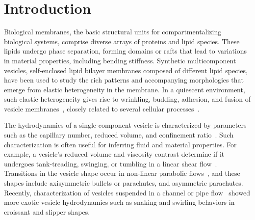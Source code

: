 \documentclass[twoside,twocolumn,9pt]{article}
\begin{document}



\section{\label{sec:Introduction}Introduction}
Biological membranes, the basic structural units for compartmentalizing
biological systems, 
comprise diverse arrays of
proteins and lipid species. 
These lipids undergo phase separation, forming domains or rafts that
lead to variations in material properties, including bending stiffness.
Synthetic multicomponent vesicles, self-enclosed lipid bilayer membranes
composed of different lipid species, have been used to study the rich
patterns and accompanying morphologies that emerge from elastic
heterogeneity in the membrane. In a quiescent environment, such elastic
heterogeneity gives rise to wrinkling, budding, adhesion, and fusion of
vesicle membranes~\cite{Lowengrub2009_PRE, Li2012_CommMathSci,
Zhao2011_PRE}, closely related to several cellular
processes~\cite{Rauch2000_BiophysJ, Takeda2003_PNAS}.

The hydrodynamics of a single-component vesicle is characterized by
parameters such as the capillary number, reduced volume, and confinement
ratio~\cite{Abreu2014_ACI}. Such characterization is often useful for
inferring fluid and material properties.
For example, a vesicle's reduced volume and viscosity contrast determine
if it undergoes tank-treading, swinging, or tumbling in a linear shear
flow~\cite{nog-gom2005}. Transitions in the vesicle shape occur in
non-linear parabolic flows~\cite{kao-bir-mis2009, dan-vla-mis2009}, and
these shapes include axisymmetric bullets or parachutes, and asymmetric
parachutes. Recently, characterization of vesicles suspended in a
channel or pipe flow~\cite{lyu-che-far-jae-mis-leo2023, aga-bir2020,
qua-gan-you2021, abb-far-nai-ezz-ben-mis2022,
wan-ii-sug-nod-jin-liu-che-gon2023, bar-sha2018b} showed more exotic
vesicle hydrodynamics such as snaking and swirling behaviors in
croissant and slipper shapes.
\end{document}
